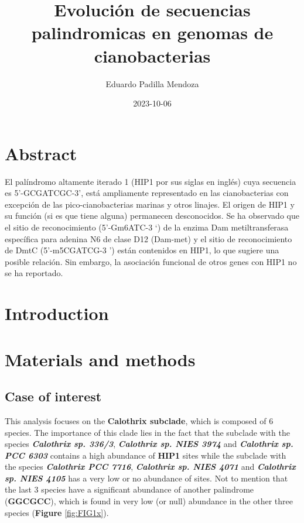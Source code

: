 \documentclass[
]{book}
\title{Evolución de secuencias palindromicas en genomas de cianobacterias}
\author{Eduardo Padilla Mendoza}
\date{2023-10-06}
\begin{document}
\maketitle

{
\setcounter{tocdepth}{1}
\tableofcontents
}
\hypertarget{abstract}{%
\chapter*{Abstract}\label{abstract}}

El palíndromo altamente iterado 1 (HIP1 por sus siglas en inglés) cuya secuencia es 5'-GCGATCGC-3', está ampliamente representado en las cianobacterias con excepción de las pico-cianobacterias marinas y otros linajes. El origen de HIP1 y su función (si es que tiene alguna) permanecen desconocidos. Se ha observado que el sitio de reconocimiento (5'-Gm6ATC-3 `) de la enzima Dam metiltransferasa específica para adenina N6 de clase D12 (Dam-met) y el sitio de reconocimiento de DmtC (5'-m5CGATCG-3 ') están contenidos en HIP1, lo que sugiere una posible relación. Sin embargo, la asociación funcional de otros genes con HIP1 no se ha reportado.

\hypertarget{introduction}{%
\chapter{Introduction}\label{introduction}}

\hypertarget{materials-and-methods}{%
\chapter{Materials and methods}\label{materials-and-methods}}

\hypertarget{case-of-interest}{%
\section{Case of interest}\label{case-of-interest}}

This analysis focuses on the \textbf{Calothrix subclade}, which is composed of 6 species. The importance of this clade lies in the fact that the subclade with the species \textbf{\emph{Calothrix sp. 336/3}}, \textbf{\emph{Calothrix sp. NIES 3974}} and \textbf{\emph{Calothrix sp. PCC 6303}} contains a high abundance of \textbf{HIP1} sites while the subclade with the species \textbf{\emph{Calothrix PCC 7716}}, \textbf{\emph{Calothrix sp. NIES 4071}} and \textbf{\emph{Calothrix sp. NIES 4105}} has a very low or no abundance of sites. Not to mention that the last 3 species have a significant abundance of another palindrome (\textbf{GGCGCC}), which is found in very low (or null) abundance in the other three species (\textbf{Figure} \ref{fig:FIG1x}).
\end{document}
